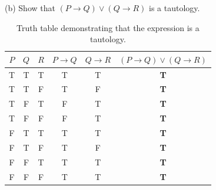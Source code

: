 \documentclass[12pt]{exam}
\begin{document}
\begin{enumerate}
\begin{table}[htbp]
\centering
{}
\caption{Truth table verifying the logical equivalence for (a).}
\end{table}

(b) Show that $(P \rightarrow Q) \lor (Q \rightarrow R)$ is a tautology.

\begin{table}[htbp]
\centering
\begin{tabular}{cccccc}
\toprule
$P$ & $Q$ & $R$ & $P \to Q$ & $Q \to R$ & $(P \to Q) \lor (Q \to R)$ \\
\midrule
T & T & T & T & T & \textbf{T} \\
T & T & F & T & F & \textbf{T} \\
T & F & T & F & T & \textbf{T} \\
T & F & F & F & T & \textbf{T} \\
F & T & T & T & T & \textbf{T} \\
F & T & F & T & F & \textbf{T} \\
F & F & T & T & T & \textbf{T} \\
F & F & F & T & T & \textbf{T} \\
\bottomrule
\end{tabular}
\caption{Truth table demonstrating that the expression is a tautology.}
\end{table}


\end{enumerate}
\end{document}
